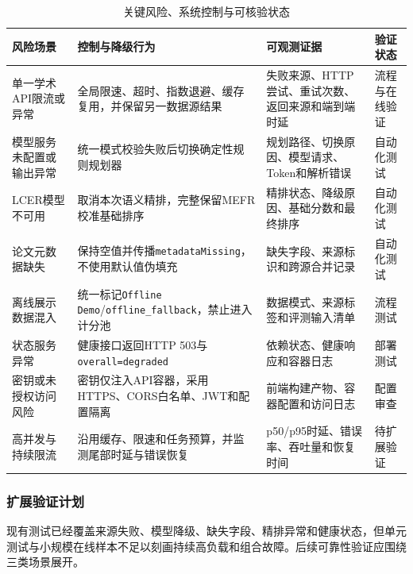 \documentclass[a4paper,12pt,fontset=none]{ctexart}
\begin{document}
\begin{table}[H]
	\centering
	\caption{关键风险、系统控制与可核验状态}
	\label{tab:reliability}
	\small
	\begin{tabularx}{\textwidth}{
			C{3.0cm}
			C{4.7cm}
			C{4.4cm}
			C{2.2cm}}
		\toprule
		\textbf{风险场景} &
		\textbf{控制与降级行为} &
		\textbf{可观测证据} &
		\textbf{验证状态} \\
		\midrule
		
		单一学术API限流或异常 &
		全局限速、超时、指数退避、缓存复用，并保留另一数据源结果 &
		失败来源、HTTP尝试、重试次数、返回来源和端到端时延 &
		流程与在线验证 \\
		
		模型服务未配置或输出异常 &
		统一模式校验失败后切换确定性规则规划器 &
		规划路径、切换原因、模型请求、Token和解析错误 &
		自动化测试 \\
		
		LCER模型不可用 &
		取消本次语义精排，完整保留MEFR校准基础排序 &
		精排状态、降级原因、基础分数和最终排序 &
		自动化测试 \\
		
		论文元数据缺失 &
		保持空值并传播\texttt{metadataMissing}，不使用默认值伪填充 &
		缺失字段、来源标识和跨源合并记录 &
		自动化测试 \\
		
		离线展示数据混入 &
		统一标记\texttt{Offline Demo}/\texttt{offline\_fallback}，禁止进入计分池 &
		数据模式、来源标签和评测输入清单 &
		流程测试 \\
		
		状态服务异常 &
		健康接口返回HTTP 503与\texttt{overall=degraded} &
		依赖状态、健康响应和容器日志 &
		部署测试 \\
		
		密钥或未授权访问风险 &
		密钥仅注入API容器，采用HTTPS、CORS白名单、JWT和配置隔离 &
		前端构建产物、容器配置和访问日志 &
		配置审查 \\
		
		高并发与持续限流 &
		沿用缓存、限速和任务预算，并监测尾部时延与错误恢复 &
		p50/p95时延、错误率、吞吐量和恢复时间 &
		待扩展验证 \\
		\bottomrule
	\end{tabularx}
\end{table}

\subsubsection{扩展验证计划}

现有测试已经覆盖来源失败、模型降级、缺失字段、精排异常和健康状态，但单元测试与小规模在线样本不足以刻画持续高负载和组合故障。后续可靠性验证应围绕三类场景展开。
\end{document}
